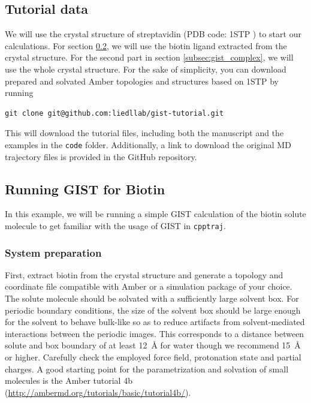 \documentclass[9pt,tutorial]{livecoms}
\newcommand{\software}{\texttt}
\newcommand\inlinecode{\texttt}
\begin{document}
\subsection{Tutorial data}
We will use the crystal structure of streptavidin (PDB code: 1STP \cite{Weber1989-streptavidin-structure}) to start our calculations.
For section \ref{subsec:gist_biotin}, we will use the biotin ligand extracted from the crystal structure.
For the second part in section \ref{subsec:gist_complex}, we will use the whole crystal structure.
For the sake of simplicity, you can download prepared and solvated Amber topologies and structures based on 1STP by running
\begin{lstlisting}[style=bash]
git clone git@github.com:liedllab/gist-tutorial.git
\end{lstlisting}
This will download the tutorial files, including both the manuscript and the examples in the \inlinecode{code} folder.
Additionally, a link to download the original MD trajectory files is provided in the GitHub repository.
\subsection{Running GIST for Biotin}
\label{subsec:gist_biotin}
In this example, we will be running a simple GIST calculation of the biotin solute molecule to get familiar with the usage of GIST in \software{cpptraj}.
\subsubsection{System preparation}
First, extract biotin from the crystal structure and generate a topology and coordinate file compatible with Amber or a simulation package of your choice.
The solute molecule should be solvated with a sufficiently large solvent box. 
For periodic boundary conditions, the size of the solvent box should be large enough for the solvent to behave bulk-like so as to reduce artifacts from solvent-mediated interactions between the periodic images. 
This corresponds to a distance between solute and box boundary of at least \SI{12}{\angstrom} for water \cite{Chen2021,Waibl2022-gist-solvents} though we recommend \SI{15}{\angstrom} or higher.
Carefully check the employed force field, protonation state and partial charges.
A good starting point for the parametrization and solvation of small molecules is the Amber tutorial 4b (\url{http://ambermd.org/tutorials/basic/tutorial4b/}).
\end{document}
